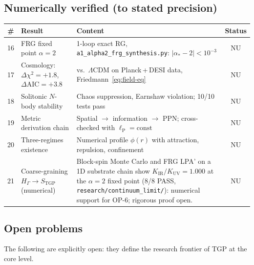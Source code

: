 \documentclass[11pt,a4paper]{article}
\newcommand{\lP}{\ell_{\mathrm{P}}}
\begin{document}
\subsection{Numerically verified (to stated precision)}

\begin{center}\small
\begin{longtable}{@{}clp{7.2cm}c@{}}
\toprule
\# & \textbf{Result} & \textbf{Content} & \textbf{Status}\\
\midrule
\endhead
16 & FRG fixed point $\alpha=2$
  & 1-loop exact RG, \texttt{a1\_alpha2\_frg\_synthesis.py}: $|\alpha_{*}-2|<10^{-3}$
  & \textsf{NU}\\
17 & Cosmology: $\Delta\chi^{2}=+1.8$, $\Delta\mathrm{AIC}=+3.8$
  & vs.\ $\Lambda$CDM on Planck\,+\,DESI data, Friedmann~\eqref{eq:field-eq}
  & \textsf{NU}\\
18 & Solitonic $N$-body stability
  & Chaos suppression, Earnshaw violation; 10/10 tests pass
  & \textsf{NU}\\
19 & Metric derivation chain
  & Spatial $\to$ information $\to$ PPN; cross-checked with $\lP=\mathrm{const}$
  & \textsf{NU}\\
20 & Three-regimes existence
  & Numerical profile $\phi(r)$ with attraction, repulsion, confinement
  & \textsf{NU}\\
21 & Coarse-graining $H_{\Gamma}\!\to\!S_{\mathrm{TGP}}$ (numerical)
  & Block-spin Monte Carlo and FRG LPA' on a 1D substrate chain show
    $K_{\mathrm{IR}}/K_{\mathrm{UV}}=1.000$ at the $\alpha=2$ fixed point
    (8/8 PASS, \texttt{research/continuum\_limit/}): numerical support for
    OP-6; rigorous proof open.
  & \textsf{NU}\\
\bottomrule
\end{longtable}
\end{center}

\subsection{Open problems}

The following are explicitly open: they define the research frontier of
TGP at the core level.
\end{document}
